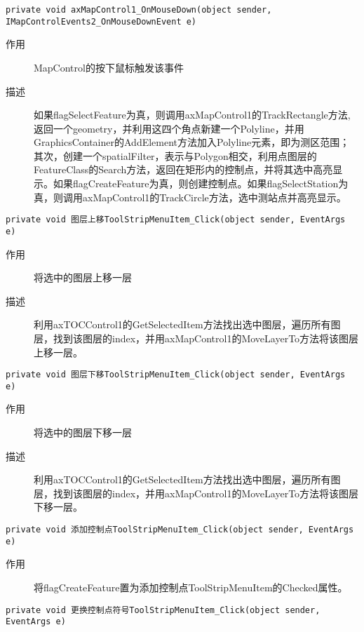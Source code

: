 \documentclass[twoside,color=blue,mathpazo,titlestyle=hang,12pt]{elegantbook}
\numberwithin{equation}{section}
\begin{document}
\begin{lstlisting}
private void axMapControl1_OnMouseDown(object sender, IMapControlEvents2_OnMouseDownEvent e)
\end{lstlisting}
\begin{description}
\item[作用] MapControl的按下鼠标触发该事件
\item[描述] 如果flagSelectFeature为真，则调用axMapControl1的TrackRectangle方法,返回一个geometry，并利用这四个角点新建一个Polyline，并用GraphicsContainer的AddElement方法加入Polyline元素，即为测区范围；其次，创建一个spatialFilter，表示与Polygon相交，利用点图层的FeatureClass的Search方法，返回在矩形内的控制点，并将其选中高亮显示。如果flagCreateFeature为真，则创建控制点。如果flagSelectStation为真，则调用axMapControl1的TrackCircle方法，选中测站点并高亮显示。
\end{description}
\begin{lstlisting}
private void 图层上移ToolStripMenuItem_Click(object sender, EventArgs e)
\end{lstlisting}
\begin{description}
\item[作用] 将选中的图层上移一层
\item[描述] 利用axTOCControl1的GetSelectedItem方法找出选中图层，遍历所有图层，找到该图层的index，并用axMapControl1的MoveLayerTo方法将该图层上移一层。
\end{description}
\begin{lstlisting}
private void 图层下移ToolStripMenuItem_Click(object sender, EventArgs e)
\end{lstlisting}
\begin{description}
\item[作用] 将选中的图层下移一层
\item[描述] 利用axTOCControl1的GetSelectedItem方法找出选中图层，遍历所有图层，找到该图层的index，并用axMapControl1的MoveLayerTo方法将该图层下移一层。
\end{description}
\begin{lstlisting}
private void 添加控制点ToolStripMenuItem_Click(object sender, EventArgs e)
\end{lstlisting}
\begin{description}
\item[作用] 将flagCreateFeature置为添加控制点ToolStripMenuItem的Checked属性。
\end{description}
\begin{lstlisting}
private void 更换控制点符号ToolStripMenuItem_Click(object sender, EventArgs e)
\end{lstlisting}
\end{document}
